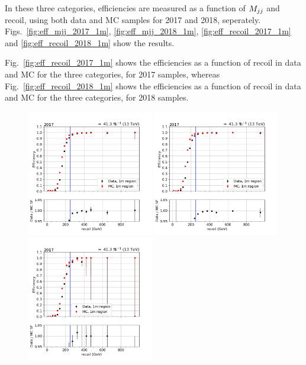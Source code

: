 In these three categories, efficiencies are measured as a function of $M_{jj}$ and recoil, using both data and MC samples for 2017 and 2018,
seperately. Figs.~\ref{fig:eff_mjj_2017_1m}, \ref{fig:eff_mjj_2018_1m}, \ref{fig:eff_recoil_2017_1m} and \ref{fig:eff_recoil_2018_1m} show 
the results. 

Fig.~\ref{fig:eff_recoil_2017_1m} shows the efficiencies as a function of recoil in data and MC for the three categories, 
for 2017 samples, whereas Fig.~\ref{fig:eff_recoil_2018_1m} shows the efficiencies as a function of recoil in data and MC 
for the three categories, for 2018 samples. %

\begin{figure}[htp]
    \begin{center}
        \includegraphics[width=0.49\textwidth]{fig/efficiency/trigger/met/recoil/data_mc_comparison_1m_2017_one_jet_forward_one_jet_central.png}
        \includegraphics[width=0.49\textwidth]{fig/efficiency/trigger/met/recoil/data_mc_comparison_1m_2017_two_central_jets.png} \\
        \includegraphics[width=0.49\textwidth]{fig/efficiency/trigger/met/recoil/data_mc_comparison_1m_2017_two_forward_jets.png}

\end{center}
\end{figure}
